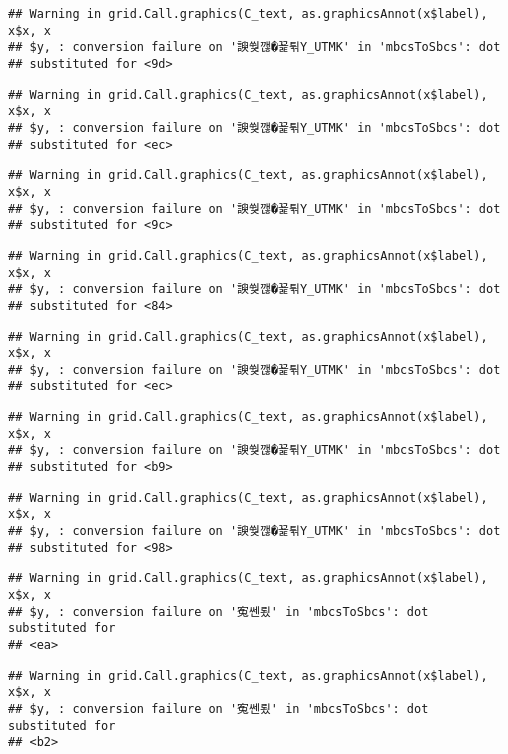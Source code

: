 \documentclass[]{article}
\begin{document}
\begin{verbatim}
## Warning in grid.Call.graphics(C_text, as.graphicsAnnot(x$label), x$x, x
## $y, : conversion failure on '諛쒖깮�꾩튂Y_UTMK' in 'mbcsToSbcs': dot
## substituted for <9d>
\end{verbatim}

\begin{verbatim}
## Warning in grid.Call.graphics(C_text, as.graphicsAnnot(x$label), x$x, x
## $y, : conversion failure on '諛쒖깮�꾩튂Y_UTMK' in 'mbcsToSbcs': dot
## substituted for <ec>
\end{verbatim}

\begin{verbatim}
## Warning in grid.Call.graphics(C_text, as.graphicsAnnot(x$label), x$x, x
## $y, : conversion failure on '諛쒖깮�꾩튂Y_UTMK' in 'mbcsToSbcs': dot
## substituted for <9c>
\end{verbatim}

\begin{verbatim}
## Warning in grid.Call.graphics(C_text, as.graphicsAnnot(x$label), x$x, x
## $y, : conversion failure on '諛쒖깮�꾩튂Y_UTMK' in 'mbcsToSbcs': dot
## substituted for <84>
\end{verbatim}

\begin{verbatim}
## Warning in grid.Call.graphics(C_text, as.graphicsAnnot(x$label), x$x, x
## $y, : conversion failure on '諛쒖깮�꾩튂Y_UTMK' in 'mbcsToSbcs': dot
## substituted for <ec>
\end{verbatim}

\begin{verbatim}
## Warning in grid.Call.graphics(C_text, as.graphicsAnnot(x$label), x$x, x
## $y, : conversion failure on '諛쒖깮�꾩튂Y_UTMK' in 'mbcsToSbcs': dot
## substituted for <b9>
\end{verbatim}

\begin{verbatim}
## Warning in grid.Call.graphics(C_text, as.graphicsAnnot(x$label), x$x, x
## $y, : conversion failure on '諛쒖깮�꾩튂Y_UTMK' in 'mbcsToSbcs': dot
## substituted for <98>
\end{verbatim}

\begin{verbatim}
## Warning in grid.Call.graphics(C_text, as.graphicsAnnot(x$label), x$x, x
## $y, : conversion failure on '寃쎈룄' in 'mbcsToSbcs': dot substituted for
## <ea>
\end{verbatim}

\begin{verbatim}
## Warning in grid.Call.graphics(C_text, as.graphicsAnnot(x$label), x$x, x
## $y, : conversion failure on '寃쎈룄' in 'mbcsToSbcs': dot substituted for
## <b2>
\end{verbatim}
\end{document}
